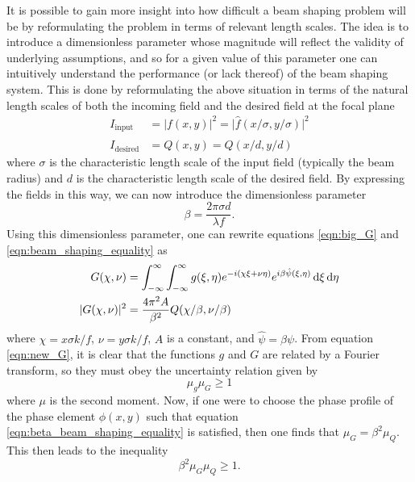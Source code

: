 It is possible to gain more insight into how difficult a beam shaping problem will be by reformulating the problem in terms of relevant length scales.  The idea is to introduce a dimensionless parameter whose magnitude will reflect the validity of underlying assumptions, and so for a given value of this parameter one can intuitively understand the performance (or lack thereof) of the beam shaping system.  This is done by reformulating the above situation in terms of the natural length scales of both the incoming field and the desired field at the focal plane
\begin{align}
	I_{\mathrm{input}} &= \rvert f(x,y)\rvert^2=\rvert\hat{f}(x/\sigma,y/\sigma)\rvert^2\\
	I_{\mathrm{desired}} &= Q(x,y)=\hat{Q}(x/d,y/d)
\end{align}
where $\sigma$ is the characteristic length scale of the input field (typically the beam radius) and $d$ is the characteristic length scale of the desired field.  By expressing the fields in this way, we can now introduce the dimensionless parameter
\begin{equation}
\label{eqn:beta_parameter}
	\beta=\frac{2\pi\sigma d}{\lambda f}.
\end{equation}
Using this dimensionless parameter, one can rewrite equations \ref{eqn:big_G} and \ref{eqn:beam_shaping_equality} as
\begin{align}
\label{eqn:new_G}
	G(\chi,\nu) &= \int_{-\infty}^{\infty}\int_{-\infty}^{\infty} g(\xi,\eta)e^{-i(\chi\xi+\nu\eta)}e^{i\beta\hat{\psi}(\xi,\eta)} \mathop{}\!\mathrm{d}\xi\mathop{}\!\mathrm{d}\eta\\
\label{eqn:beta_beam_shaping_equality}
	\rvert G(\chi, \nu)\rvert^2 &= \frac{4\pi^2 A}{\beta^2}Q(\chi/\beta,\nu/\beta)
\end{align}
where $\chi=x\sigma k /f$, $\nu=y\sigma k /f$, $A$ is a constant, and $\hat{\psi} = \beta\psi$. From equation \ref{eqn:new_G}, it is clear that the functions $g$ and $G$ are related by a Fourier transform, so they must obey the uncertainty relation given by
\begin{equation}
	\mu_g \mu_G\geq 1
\end{equation}
where $\mu$ is the second moment.  Now, if one were to choose the phase profile of the phase element $\phi(x,y)$ such that equation \ref{eqn:beta_beam_shaping_equality} is satisfied, then one finds that $\mu_G=\beta^2\mu_Q$.  This then leads to the inequality
\begin{equation}
\label{eqn:beta_inequalty}
	\beta^2 \mu_G\mu_Q\geq 1.
\end{equation}

